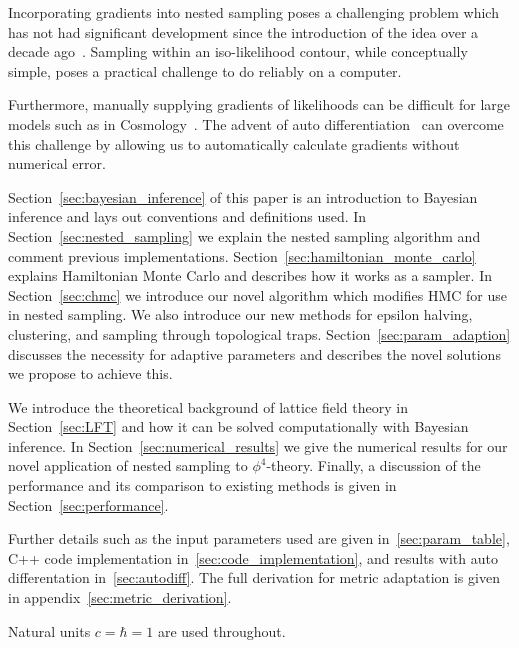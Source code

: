 \documentclass[11pt]{article}
\begin{document}
    Incorporating gradients into nested sampling poses a challenging problem which has not had significant development
    since the introduction of the idea over a decade ago~\cite{Betancourt_NS_CHMC, GMC}.
    Sampling within an iso-likelihood contour, while conceptually simple, poses a practical challenge to do reliably on
    a computer.

    Furthermore, manually supplying gradients of likelihoods can be difficult for large models such as in
    Cosmology~\cite{plank2018, Handley_2015, mukherjee2006nested}.
    The advent of auto differentiation~\cite{NEURIPS2020_9332c513, 10.1145/3458817.3476165, 10.5555/3571885.3571964}
    can overcome this challenge by allowing us to automatically calculate gradients without
    numerical error.

    Section~\ref{sec:bayesian_inference} of this paper is an introduction to Bayesian inference and lays out conventions
    and definitions used.
    In Section~\ref{sec:nested_sampling} we explain the nested sampling algorithm and comment
    previous implementations.
    Section~\ref{sec:hamiltonian_monte_carlo} explains Hamiltonian Monte Carlo and describes how it works as a sampler.
    In Section~\ref{sec:chmc} we introduce our novel algorithm which modifies HMC for use in nested sampling.
    We also introduce our new methods for epsilon halving, clustering, and sampling through topological traps.
    Section~\ref{sec:param_adaption} discusses the necessity for adaptive parameters and describes
    the novel solutions we propose to achieve this.

    We introduce the theoretical background of lattice field theory in Section~\ref{sec:LFT} and how it can be
    solved computationally with Bayesian inference.
    In Section~\ref{sec:numerical_results} we give the numerical results for our novel application of nested
    sampling to $\phi^4$-theory.
    Finally, a discussion of the performance and its comparison to existing methods is given in Section~\ref{sec:performance}.

    Further details such as the input parameters used are given in~\cref{sec:param_table},
    C++ code implementation in~\cref{sec:code_implementation}, and results with auto differentation in~\cref{sec:autodiff}.
    The full derivation for metric adaptation is given in appendix~\ref{sec:metric_derivation}.

    Natural units $c = \hbar = 1$ are used throughout.
\end{document}
